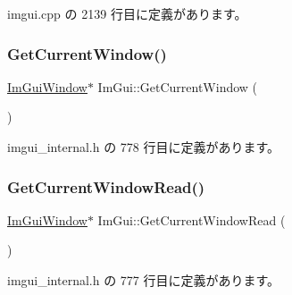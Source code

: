  imgui.\+cpp の 2139 行目に定義があります。

\mbox{\label{namespace_im_gui_a7ceba68eca2b09fb6bf1ad88037e6203}} 
\subsubsection{\texorpdfstring{Get\+Current\+Window()}{GetCurrentWindow()}}
{\footnotesize\ttfamily \mbox{\hyperlink{struct_im_gui_window}{Im\+Gui\+Window}}$\ast$ Im\+Gui\+::\+Get\+Current\+Window (\begin{DoxyParamCaption}{ }\end{DoxyParamCaption})\hspace{0.3cm}{\ttfamily [inline]}}



 imgui\+\_\+internal.\+h の 778 行目に定義があります。

\mbox{\label{namespace_im_gui_a408f9ddac92f8629a7e273ced5f8c3aa}} 
\subsubsection{\texorpdfstring{Get\+Current\+Window\+Read()}{GetCurrentWindowRead()}}
{\footnotesize\ttfamily \mbox{\hyperlink{struct_im_gui_window}{Im\+Gui\+Window}}$\ast$ Im\+Gui\+::\+Get\+Current\+Window\+Read (\begin{DoxyParamCaption}{ }\end{DoxyParamCaption})\hspace{0.3cm}{\ttfamily [inline]}}



 imgui\+\_\+internal.\+h の 777 行目に定義があります。

